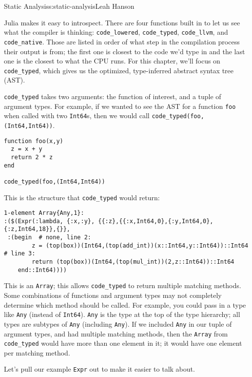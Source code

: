 \begin{aosachapter}{Static Analysis}{s:static-analysis}{Leah Hanson}
\label{introspection-in-julia}

Julia makes it easy to introspect. There are four functions built in to
let us see what the compiler is thinking: \texttt{code\_lowered},
\texttt{code\_typed}, \texttt{code\_llvm}, and \texttt{code\_native}.
Those are listed in order of what step in the compilation process their
output is from; the first one is closest to the code we'd type in and
the last one is the closest to what the CPU runs. For this chapter,
we'll focus on \texttt{code\_typed}, which gives us the optimized,
type-inferred abstract syntax tree (AST).

\texttt{code\_typed} takes two arguments: the function of interest, and
a tuple of argument types. For example, if we wanted to see the AST for
a function \texttt{foo} when called with two \texttt{Int64}s, then we
would call \texttt{code\_typed(foo, (Int64,Int64))}.

\begin{verbatim}
function foo(x,y)
  z = x + y
  return 2 * z
end

code_typed(foo,(Int64,Int64))
\end{verbatim}

This is the structure that \texttt{code\_typed} would return:

\begin{verbatim}
1-element Array{Any,1}:
:($(Expr(:lambda, {:x,:y}, {{:z},{{:x,Int64,0},{:y,Int64,0},{:z,Int64,18}},{}},
 :(begin  # none, line 2:
        z = (top(box))(Int64,(top(add_int))(x::Int64,y::Int64))::Int64 # line 3:
        return (top(box))(Int64,(top(mul_int))(2,z::Int64))::Int64
    end::Int64))))
\end{verbatim}

This is an \texttt{Array}; this allows \texttt{code\_typed} to return
multiple matching methods. Some combinations of functions and argument
types may not completely determine which method should be called. For
example, you could pass in a type like \texttt{Any} (instead of
\texttt{Int64}). \texttt{Any} is the type at the top of the type
hierarchy; all types are subtypes of \texttt{Any} (including
\texttt{Any}). If we included \texttt{Any} in our tuple of argument
types, and had multiple matching methods, then the \texttt{Array} from
\texttt{code\_typed} would have more than one element in it; it would
have one element per matching method.

Let's pull our example \texttt{Expr} out to make it easier to talk
about.


\end{aosachapter}
